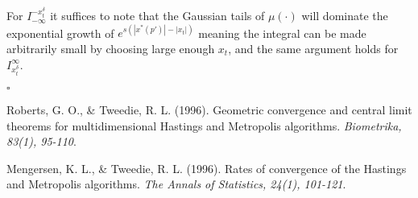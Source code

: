 \documentclass{article}
\begin{document}
For $I_{-\infty}^{-x_t^\delta}$ it suffices to note that the Gaussian tails of $\mu(\cdot)$ will dominate the exponential growth of $e^{s(|x^*(p')|-|x_t|)}$ meaning the integral can be made arbitrarily small by choosing large enough $x_t$, and the same argument holds for $I_{x_t^\delta}^{\infty}$.

\hfill $\square$

\begin{thebibliography}{1}

 Roberts, G. O., \& Tweedie, R. L. (1996). Geometric convergence and central limit theorems for multidimensional Hastings and Metropolis algorithms. \emph{Biometrika, 83(1), 95-110}.

 Mengersen, K. L., \& Tweedie, R. L. (1996). Rates of convergence of the Hastings and Metropolis algorithms. \emph{The Annals of Statistics, 24(1), 101-121}.

\end{thebibliography}
\end{document}
